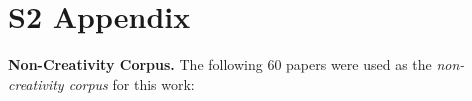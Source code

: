 \documentclass[10pt,letterpaper]{article}
\begin{document}
%
%

%
\section*{S2 Appendix}\label{S2_Appendix}
{\bf Non-Creativity Corpus.} The following 60 papers were used as the {\em non-creativity corpus} for this work:
\end{document}
